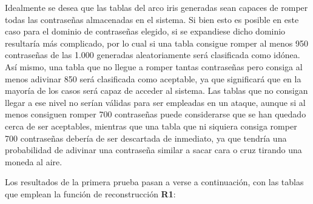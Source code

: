 \documentclass[12pt,spanish,listoffigures,listoftables]{tfgetsinf}
\begin{document}
Idealmente se desea que las tablas del arco iris generadas sean capaces de romper todas las contraseñas almacenadas en el sistema. Si bien esto es posible en este caso para el dominio de contraseñas elegido, si se expandiese dicho dominio resultaría más complicado, por lo cual si una tabla consigue romper al menos 950 contraseñas de las 1.000 generadas aleatoriamente será clasificada como idónea. Así mismo, una tabla que no llegue a romper tantas contraseñas pero consiga al menos adivinar 850 será clasificada como aceptable, ya que significará que en la mayoría de los casos será capaz de acceder al sistema. Las tablas que no consigan llegar a ese nivel no serían válidas para ser empleadas en un ataque, aunque si al menos consiguen romper 700 contraseñas puede considerarse que se han quedado cerca de ser aceptables, mientras que una tabla que ni siquiera consiga romper 700 contraseñas debería de ser descartada de inmediato, ya que tendría una probabilidad de adivinar una contraseña similar a sacar cara o cruz tirando una moneda al aire.

Los resultados de la primera prueba pasan a verse a continuación, con las tablas que emplean la función de reconstrucción \textbf{R1}:
\end{document}
